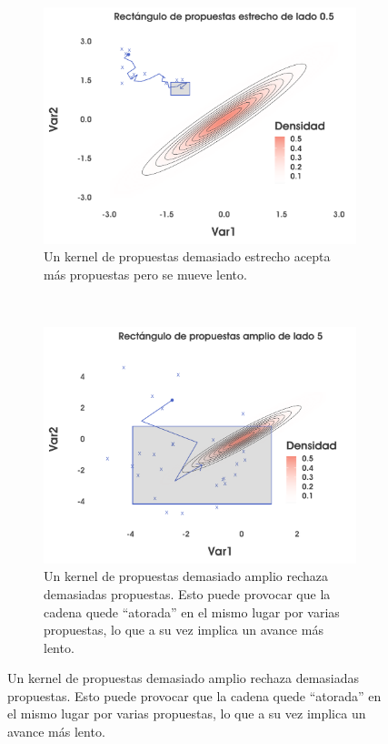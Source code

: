 \begin{figure}
    \centering
    \begin{subfigure}{0.35\textwidth}
        \includegraphics[width=\textwidth]{Figs/Bayes/Ejemplo_RWM_Compara1}
        \caption{Un kernel de propuestas demasiado estrecho acepta más propuestas pero se mueve lento.}
    \end{subfigure}
    ~
    \begin{subfigure}{0.35\textwidth}
        \includegraphics[width=\textwidth]{Figs/Bayes/Ejemplo_RWM_Compara3}
        \caption{Un kernel de propuestas demasiado amplio rechaza demasiadas propuestas. Esto puede provocar que la cadena quede ``atorada'' en el mismo lugar por varias propuestas, lo que a su vez implica un avance más lento.}

\end{subfigure}
\end{figure}

